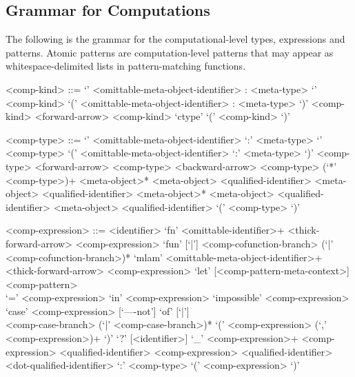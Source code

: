 \subsection{Grammar for Computations}\label{section:syntax-computations}

The following is the grammar for the computational-level types, expressions and patterns.
Atomic patterns are computation-level patterns that may appear as whitespace-delimited lists in pattern-matching functions.

\begin{grammar}
<comp-kind> ::= `{' <omittable-meta-object-identifier> : <meta-type> `}' <comp-kind>
\alt `(' <omittable-meta-object-identifier> : <meta-type> `)' <comp-kind>
 <forward-arrow> <comp-kind>
\alt `ctype'
\alt `(' <comp-kind> `)'

<comp-type> ::= `{' <omittable-meta-object-identifier> `:' <meta-type> `}' <comp-type>
\alt `(' <omittable-meta-object-identifier> `:' <meta-type> `)' <comp-type>
 <forward-arrow> <comp-type>
 <backward-arrow> <comp-type>
 (`*' <comp-type>)+
 <meta-object>*
 <meta-object>
 <qualified-identifier> <meta-object>
 <qualified-identifier>
 <meta-object>*
 <meta-object>
 <qualified-identifier> <meta-object>
 <qualified-identifier>
\alt `(' <comp-type> `)'

<comp-expression> ::= <identifier>
\alt `fn' <omittable-identifier>+ <thick-forward-arrow> <comp-expression>
\alt `fun' [`|'] <comp-cofunction-branch> (`|' <comp-cofunction-branch>)*
\alt `mlam' <omittable-meta-object-identifier>+\\
<thick-forward-arrow> <comp-expression>
\alt `let' [<comp-pattern-meta-context>] <comp-pattern>\\
`=' <comp-expression> `in' <comp-expression>
\alt `impossible' <comp-expression>
\alt `case' <comp-expression> [`----not'] `of' [`|']\\
<comp-case-branch> (`|' <comp-case-branch>)*
\alt `(' <comp-expression> (`,' <comp-expression>)+ `)'
\alt `?' [<identifier>]
\alt `_'
 <comp-expression>+
 <comp-expression>
 <qualified-identifier> <comp-expression>
 <qualified-identifier>
 <dot-qualified-identifier>
 `:' <comp-type>
\alt `(' <comp-expression> `)'


\end{grammar}
